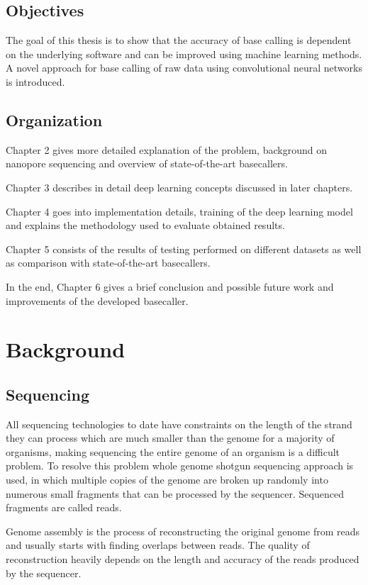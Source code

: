 \documentclass[times, utf8, diplomski, numeric, english]{fer}
\begin{document}
\section{Objectives}
The goal of this thesis is to show that the accuracy of base calling is dependent on the underlying software and can be improved using machine learning methods. A novel approach for base calling of raw data using convolutional neural networks is introduced.

\section{Organization}
\indent Chapter 2 gives more detailed explanation of the problem, background on nanopore sequencing and overview of state-of-the-art basecallers.

Chapter 3 describes in detail deep learning concepts discussed in later chapters.

Chapter 4 goes into implementation details, training of the deep learning model and explains the methodology used to evaluate obtained results. 

Chapter 5 consists of the results of testing performed on different datasets as well as comparison with state-of-the-art basecallers.

In the end, Chapter 6 gives a brief conclusion and possible future work and improvements of the developed basecaller.

\chapter{Background}

\section{Sequencing}

All sequencing technologies to date have constraints on the length of the strand they can process which are much smaller than the genome for a majority of organisms, making sequencing the entire genome of an organism is a difficult problem. To resolve this problem whole genome shotgun sequencing approach is used, in which multiple copies of the genome are broken up randomly into numerous small fragments that can be processed by the sequencer. Sequenced fragments are called reads.

Genome assembly is the process of reconstructing the original genome from reads and usually starts with finding overlaps between reads.
The quality of reconstruction heavily depends on the length and accuracy of the reads produced by the sequencer.
\end{document}
